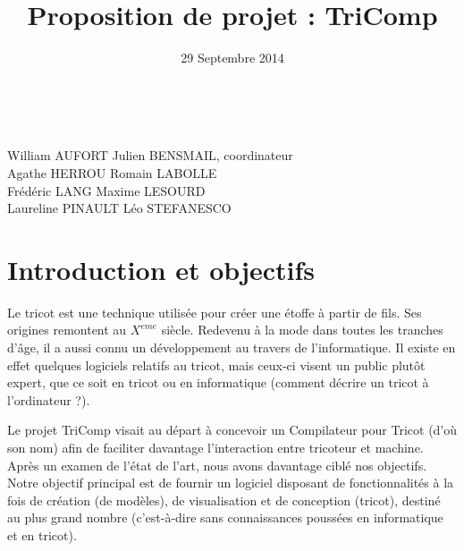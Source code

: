 \documentclass{article}
\title{Proposition de projet : TriComp}
\author{}
\date{29 Septembre 2014}
\begin{document}
\makeatletter %
  \begin{titlepage}
    \begin{center}
       {\LARGE \@title} \\
       \vspace{1cm}
       {\large \@date}
       \vspace{2cm}
    \end{center}
       {\large
       William AUFORT \hfill Julien BENSMAIL, coordinateur\\
       Agathe HERROU  \hfill Romain LABOLLE \\
       Frédéric LANG \hfill Maxime LESOURD \\
       Laureline PINAULT \hfill Léo STEFANESCO}
  \tableofcontents
  \end{titlepage}
\makeatother

\pagebreak

%



\section{Introduction et objectifs}

Le tricot est une technique utilisée pour créer une étoffe à partir de fils. Ses origines remontent au $X^{eme}$ siècle.
Redevenu à la mode dans toutes les tranches d'âge, il a aussi connu un développement au travers de l'informatique. Il existe en effet 
quelques logiciels relatifs au tricot, mais ceux-ci visent un public plutôt expert, que ce soit en tricot ou en informatique (comment
décrire un tricot à l'ordinateur ?). 

Le projet TriComp visait au départ à concevoir un Compilateur pour Tricot (d'où son nom) afin de faciliter davantage l'interaction entre
tricoteur et machine. Après un examen de l'état de l'art, nous avons davantage ciblé nos objectifs. Notre objectif principal est de 
fournir un logiciel disposant de fonctionnalités à la fois de création (de modèles), de visualisation et de conception (tricot), 
destiné au plus grand nombre (c'est-à-dire sans connaissances poussées en informatique et en tricot).
\end{document}
